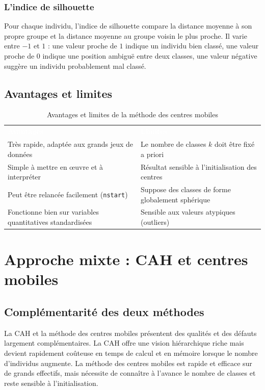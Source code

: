 \documentclass[11pt,a4paper]{report}
\begin{document}
	\subsection{L'indice de silhouette}
	Pour chaque individu, l'indice de silhouette compare la distance moyenne à son propre groupe et la distance moyenne au groupe voisin le plus proche. Il varie entre $-1$ et $1$ : une valeur proche de $1$ indique un individu bien classé, une valeur proche de $0$ indique une position ambiguë entre deux classes, une valeur négative suggère un individu probablement mal classé.
	
	\section{Avantages et limites}
	
	\begin{table}[h]
		\centering
		\small
		\begin{tabularx}{\textwidth}{X X}
			\rowcolor{navy}
			\textcolor{white}{\bfseries Avantages} & \textcolor{white}{\bfseries Limites} \\
			Très rapide, adaptée aux grands jeux de données & Le nombre de classes $k$ doit être fixé a priori \\
			Simple à mettre en œuvre et à interpréter & Résultat sensible à l'initialisation des centres \\
			Peut être relancée facilement (\texttt{nstart}) & Suppose des classes de forme globalement sphérique \\
			Fonctionne bien sur variables quantitatives standardisées & Sensible aux valeurs atypiques (outliers) \\
		\end{tabularx}
		\caption{Avantages et limites de la méthode des centres mobiles}
	\end{table}
	
	\chapter{Approche mixte : CAH et centres mobiles}
	
	\section{Complémentarité des deux méthodes}
	
	La CAH et la méthode des centres mobiles présentent des qualités et des défauts largement complémentaires. La CAH offre une vision hiérarchique riche mais devient rapidement coûteuse en temps de calcul et en mémoire lorsque le nombre d'individus augmente. La méthode des centres mobiles est rapide et efficace sur de grands effectifs, mais nécessite de connaître à l'avance le nombre de classes et reste sensible à l'initialisation.
	
\end{document}

